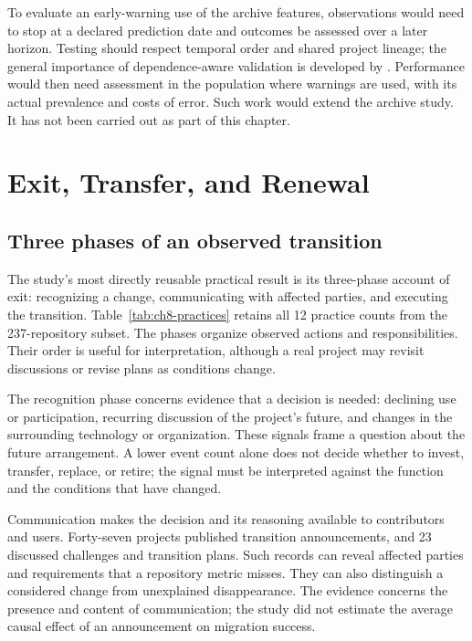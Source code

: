 To evaluate an early-warning use of the archive features, observations would need to stop at a declared prediction date and outcomes be assessed over a later horizon. Testing should respect temporal order and shared project lineage; the general importance of dependence-aware validation is developed by \citet{roberts2017}. Performance would then need assessment in the population where warnings are used, with its actual prevalence and costs of error. Such work would extend the archive study. It has not been carried out as part of this chapter.

\section{Exit, Transfer, and Renewal}
\label{sec:ch8-exit}

\subsection{Three phases of an observed transition}
The study's most directly reusable practical result is its three-phase account of exit: recognizing a change, communicating with affected parties, and executing the transition. Table~\ref{tab:ch8-practices} retains all 12 practice counts from the 237-repository subset. The phases organize observed actions and responsibilities. Their order is useful for interpretation, although a real project may revisit discussions or revise plans as conditions change.



The recognition phase concerns evidence that a decision is needed: declining use or participation, recurring discussion of the project's future, and changes in the surrounding technology or organization. These signals frame a question about the future arrangement. A lower event count alone does not decide whether to invest, transfer, replace, or retire; the signal must be interpreted against the function and the conditions that have changed.

Communication makes the decision and its reasoning available to contributors and users. Forty-seven projects published transition announcements, and 23 discussed challenges and transition plans. Such records can reveal affected parties and requirements that a repository metric misses. They can also distinguish a considered change from unexplained disappearance. The evidence concerns the presence and content of communication; the study did not estimate the average causal effect of an announcement on migration success.

